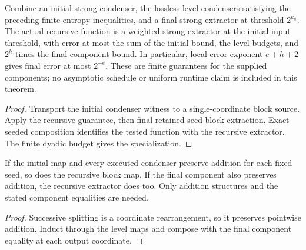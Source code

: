 \begin{theorem}
  \label{thm:lowerbounds-algebraic-recursive-block-extractor}
  \leanok
  Combine an initial strong condenser, the lossless level condensers
  satisfying the preceding finite entropy inequalities, and a final strong
  extractor at threshold $2^{k_h}$. The actual recursive function is a
  weighted strong extractor at the initial input threshold, with error
  at most the sum of the initial bound, the level budgets, and $2^h$ times
  the final component bound. In particular, local error exponent $e+h+2$
  gives final error at most $2^{-e}$. These are finite guarantees for the
  supplied components; no asymptotic schedule or uniform runtime claim is
  included in this theorem.
\end{theorem}
\begin{proof}
  \leanok
  Transport the initial condenser witness to a single-coordinate block
  source. Apply the recursive guarantee, then final retained-seed block
  extraction. Exact seeded composition identifies the tested function with
  the recursive extractor. The finite dyadic budget gives the specialization.
\end{proof}

\begin{theorem}
  \label{thm:lowerbounds-algebraic-recursive-block-additivity}
  \leanok
  If the initial map and every executed condenser preserve addition for
  each fixed seed, so does the recursive block map. If the final component
  also preserves addition, the recursive extractor does too. Only addition
  structures and the stated component equalities are needed.
\end{theorem}
\begin{proof}
  \leanok
  Successive splitting is a coordinate rearrangement, so it preserves
  pointwise addition. Induct through the level maps and compose with the
  final component equality at each output coordinate.
\end{proof}

